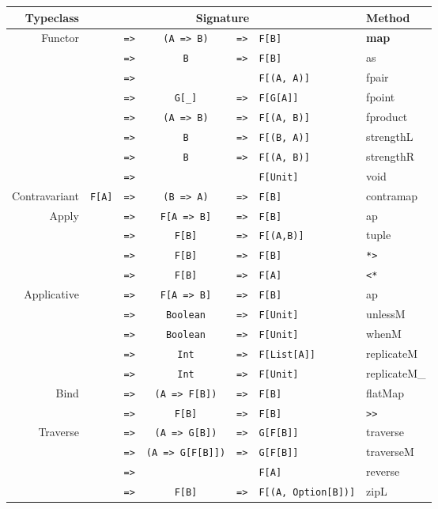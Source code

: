 \documentclass{tufte-handout}
\newcommand{\fa}{F[A]}
\newcommand{\fb}{F[B]}
\newcommand{\rarr}{\texttt{=>}}
\newcommand{\fTwo}[2]{\texttt{#1} & \rarr & & & \texttt{#2}}
\newcommand{\fThree}[3]{\texttt{#1} & \rarr & \texttt{#2} & \rarr & \texttt{#3}}
\begin{document}
\begin{table}[ht]
  \centering
  \selectfont
  \begin{tabular}{rrcclll}
    Typeclass & \multicolumn{5}{c}{Signature} & Method \\
    \midrule
    \multirow{8}{*}{Functor}
      & \fThree{\multirow{8}{*}{\fa}}{(A => B)}{\fb} & \textbf{map} \\
      & \fThree{}{B}{\fb} & as \\
      & \fTwo{}{F[(A, A)]} & fpair \\
      & \fThree{}{G[\_]}{F[G[A]]} & fpoint \\
      & \fThree{}{(A => B)}{F[(A, B)]} & fproduct \\
      & \fThree{}{B}{F[(B, A)]} & strengthL \\
      & \fThree{}{B}{F[(A, B)]} & strengthR \\
      & \fTwo{}{F[Unit]} & void \\[.5cm]
    Contravariant & \fThree{\fa}{(B => A)}{\fb} & contramap \\[.5cm]
    \multirow{4}{*}{Apply}
      & \fThree{\multirow{4}{*}{\fa}}{F[A => B]}{\fb} & ap \\
      & \fThree{}{\fb}{F[(A,B)]} & tuple \\
      & \fThree{}{\fb}{\fb} & \verb$*>$ \\
      & \fThree{}{\fb}{\fa} & \verb$<*$ \\[.5cm]
    \multirow{5}{*}{Applicative}
      & \fThree{\multirow{5}{*}{\fa}}{F[A => B]}{\fb} & ap \\
      & \fThree{}{Boolean}{F[Unit]} & unlessM \\
      & \fThree{}{Boolean}{F[Unit]} & whenM \\
      & \fThree{}{Int}{F[List[A]]} & replicateM \\
      & \fThree{}{Int}{F[Unit]} & replicateM\_ \\[.5cm]
    \multirow{2}{*}{Bind}
      & \fThree{\multirow{2}{*}{\fa}}{(A => F[B])}{\fb} & flatMap \\
      & \fThree{}{\fb}{\fb} & \verb$>>$ \\[.5cm]
    \multirow{6}{*}{Traverse}
      & \fThree{\multirow{5}{*}{\fa}}{(A => G[B])}{G[F[B]]} & traverse \\
      & \fThree{}{(A => G[F[B]])}{G[F[B]]} & traverseM \\
      & \fTwo{}{\fa} & reverse \\
      & \fThree{}{\fb}{F[(A, Option[B])]} & zipL \\

\end{tabular}
\end{table}
\end{document}
